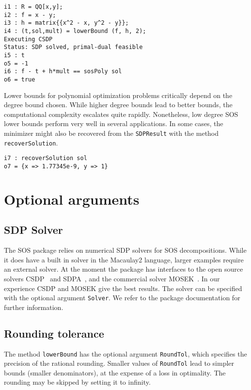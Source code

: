 \documentclass[11pt]{amsart}
\theoremstyle{plain}%
\theoremstyle{definition}
\theoremstyle{remark}
\newcommand{\Mac}{Macaulay2\xspace}
\newcommand{\SOS}{\textsc{SOS}\xspace}
\begin{document}
{\small
\begin{verbatim}
i1 : R = QQ[x,y];
i2 : f = x - y;
i3 : h = matrix{{x^2 - x, y^2 - y}};
i4 : (t,sol,mult) = lowerBound (f, h, 2);
Executing CSDP
Status: SDP solved, primal-dual feasible
i5 : t
o5 = -1
i6 : f - t + h*mult == sosPoly sol
o6 = true
\end{verbatim}
}

Lower bounds for polynomial optimization problems critically depend on the degree bound chosen.
While higher degree bounds lead to better bounds, the computational complexity escalates quite rapidly.
Nonetheless, low degree SOS lower bounds perform very well in several applications.
In some cases, the minimizer might also be recovered from the \verb|SDPResult| with the method \verb|recoverSolution|.

{\small
\begin{verbatim}
i7 : recoverSolution sol
o7 = {x => 1.77345e-9, y => 1}
\end{verbatim}
}

\section{Optional arguments}
\label{s:arguments}

\subsection*{SDP Solver}
The \SOS package relies on numerical SDP solvers for SOS decompositions.  
While it does have a built in solver in the \Mac language, larger examples require an external solver.
At the moment the package has interfaces to the open source solvers CSDP~\cite{borchers1999csdp} and SDPA~\cite{yamashita2003implementation}, and the commercial solver MOSEK~\cite{mosek}.
In our experience CSDP and MOSEK give the best results.
The solver can be specified with the optional argument \verb|Solver|.
We refer to the package documentation for further information.

\subsection*{Rounding tolerance}
The method \verb|lowerBound| has the optional argument \verb|RoundTol|, which specifies the precision of the rational rounding.
Smaller values of \verb|RoundTol| lead to simpler bounds (smaller denominators), at the expense of a loss in optimality.
The rounding may be skipped by setting it to infinity.
\end{document}
